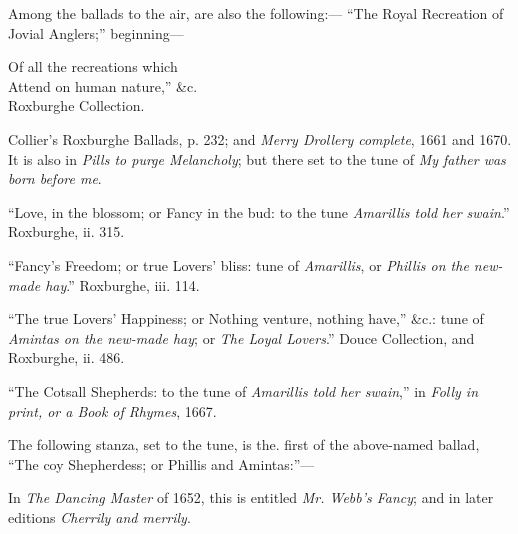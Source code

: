 Among the ballads to the air, are also the following:—
\settowidth{\versewidth}{Attend on human nature,” \&c.}
“The Royal Recreation of Jovial Anglers;” beginning—
\begin{scverse}
Of all the recreations which\\
Attend on human nature,” \&c.\\
\attribution Roxburghe Collection.
\end{scverse}
Collier’s Roxburghe Ballads, p. 232; and \textit{Merry Drollery complete}, 1661 and
1670. It is also in \textit{ Pills to purge Melancholy}; but there set to the tune of
\textit{My father was born before me}.

“Love, in the blossom; or Fancy in the bud: to the tune \textit{Amarillis told her
swain}.” Roxburghe, ii. 315.

“Fancy’s Freedom; or true Lovers’ bliss: tune of \textit{Amarillis}, or \textit{Phillis on the
new-made hay}.” Roxburghe, iii. 114.

“The true Lovers’ Happiness; or Nothing venture, nothing have,” \&c.: tune
of \textit{Amintas on the new-made hay}; or \textit{The Loyal Lovers}.” Douce Collection, and
Roxburghe, ii. 486.

“The Cotsall Shepherds: to the tune of \textit{Amarillis told her swain},” in \textit{Folly in
print, or a Book of Rhymes}, 1667.

The following stanza, set to the tune, is the. first of the above-named ballad,
“The coy Shepherdess; or Phillis and Amintas:”—



\pagebreak
{}


In \textit{The Dancing Master} of 1652, this is entitled \textit{Mr. Webb’s Fancy}; and in
later editions \textit{Cherrily and merrily}.

